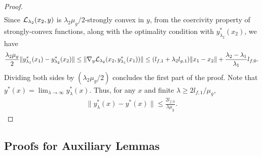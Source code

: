 \begin{proof}
\begin{align*}
    \end{align*}
    Since $\mathcal{L}_{\lambda_2} (x_2, y)$ is $\lambda_2\mu_g/2$-strongly convex in $y$, from the coercivity property of strongly-convex functions, along with the optimality condition with $y^*_{\lambda_2}(x_2)$, we have
    \begin{align*}
        \frac{\lambda_2 \mu_g}{2} \|y_{\lambda_1}^*(x_1) - y^*_{\lambda_2}(x_2) \| \le \|\nabla_y \mathcal{L}_{\lambda_2} (x_2,y_{\lambda_1}^*(x_1))\| \le (l_{f,1}+\lambda_2 l_{g,1}) \|x_1 - x_2\| + \frac{\lambda_2 - \lambda_1}{\lambda_1} l_{f,0}.
    \end{align*}
    Dividing both sides by $(\lambda_2\mu_g/2)$ concludes the first part of the proof. 
    Note that $y^*(x) = \lim_{\lambda \rightarrow \infty} y_\lambda^*(x)$. Thus, for any $x$ and finite $\lambda \ge 2l_{f,1} / \mu_g$,
    \begin{align*}
        \|y^*_{\lambda} (x) - y^*(x)\| \le \frac{2l_{f,0}}{\lambda\mu_g}. 
    \end{align*}
\end{proof}

























\subsection{Proofs for Auxiliary Lemmas}
